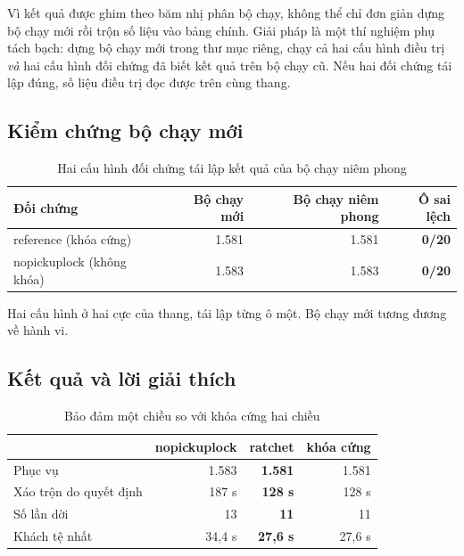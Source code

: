 Vì kết quả được ghim theo băm nhị phân bộ chạy, không thể chỉ đơn giản dựng bộ chạy mới rồi trộn
số liệu vào bảng chính. Giải pháp là một thí nghiệm phụ tách bạch: dựng bộ chạy mới trong thư
mục riêng, chạy cả hai cấu hình điều trị \emph{và} hai cấu hình đối chứng đã biết kết quả trên
bộ chạy cũ. Nếu hai đối chứng tái lập đúng, số liệu điều trị đọc được trên cùng thang.

\subsection{Kiểm chứng bộ chạy mới}

\begin{table}[htbp]
\centering
\caption{Hai cấu hình đối chứng tái lập kết quả của bộ chạy niêm phong}
\label{bang:doichung}
\small
\begin{tabular}{@{}lrrr@{}}
\toprule
\textbf{Đối chứng} & \textbf{Bộ chạy mới} & \textbf{Bộ chạy niêm phong} & \textbf{Ô sai lệch}\\
\midrule
reference (khóa cứng) & 1.581 & 1.581 & \textbf{0/20}\\
nopickuplock (không khóa) & 1.583 & 1.583 & \textbf{0/20}\\
\bottomrule
\end{tabular}
\end{table}

Hai cấu hình ở hai cực của thang, tái lập từng ô một. Bộ chạy mới tương đương về hành vi.

\subsection{Kết quả và lời giải thích}

\begin{table}[htbp]
\centering
\caption{Bảo đảm một chiều so với khóa cứng hai chiều}
\label{bang:ratchet}
\small
\begin{tabular}{@{}lrrr@{}}
\toprule
& \textbf{nopickuplock} & \textbf{ratchet} & \textbf{khóa cứng}\\
\midrule
Phục vụ & 1.583 & \textbf{1.581} & 1.581\\
Xáo trộn do quyết định & 187 s & \textbf{128 s} & 128 s\\
Số lần dời & 13 & \textbf{11} & 11\\
Khách tệ nhất & 34{,}4 s & \textbf{27{,}6 s} & 27{,}6 s\\
\bottomrule
\end{tabular}
\end{table}

